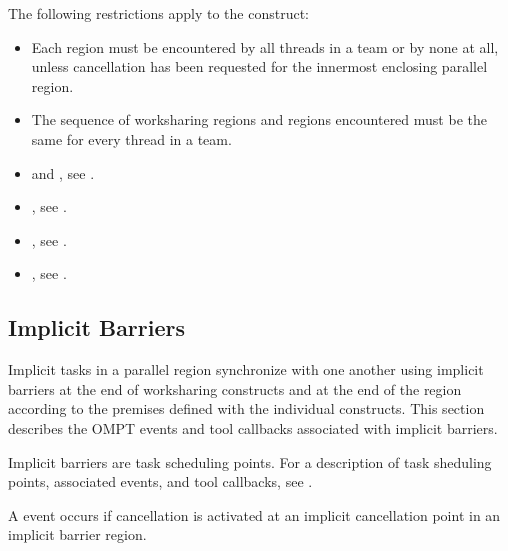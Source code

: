 \restrictions
The following restrictions apply to the  construct:

\begin{itemize}
\item Each  region must be encountered by all threads in a team or by none at all,
unless cancellation has been requested for the innermost enclosing parallel region.

\item The sequence of worksharing regions and  regions encountered must be the
same for every thread in a team.
\end{itemize}

\crossreferences
\begin{itemize}
\item {} and , see
.

\item {}, see
.

\item {}, see
.

\item {}, see
.

\end{itemize}






\subsection{Implicit Barriers}
\label{subsec:implict-barrier}

Implicit tasks in a parallel region synchronize with one another using
implicit barriers at the end of worksharing constructs and at the end
of the  region according to the premises defined with
the individual constructs. This section describes the OMPT events and
tool callbacks associated with implicit barriers.

Implicit barriers are task scheduling points. For a description of
task sheduling points, associated events, and tool callbacks, see
.

\events

A  event occurs if cancellation is activated at an
implicit cancellation point in an implicit barrier region.

